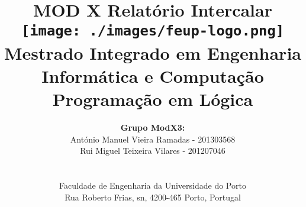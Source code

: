 \documentclass[a4paper]{article}
\begin{document}
\setlength{\textwidth}{16cm}
\setlength{\textheight}{22cm}

\title{\Huge\textbf{MOD X}\linebreak\linebreak\linebreak
\Large\textbf{Relatório Intercalar}\linebreak\linebreak
\linebreak\linebreak
\texttt{[image: ./images/feup-logo.png]}\linebreak\linebreak
\linebreak\linebreak
\Large{Mestrado Integrado em Engenharia Informática e Computação} \linebreak\linebreak
\Large{Programação em Lógica}\linebreak
}

\author{\textbf{Grupo ModX3:}\\
António Manuel Vieira Ramadas - 201303568 \\
Rui Miguel Teixeira Vilares - 201207046 \\
\linebreak\linebreak \\
 \\ Faculdade de Engenharia da Universidade do Porto \\ Rua Roberto Frias, s\/n, 4200-465 Porto, Portugal \linebreak\linebreak\linebreak
\linebreak\linebreak\vspace{1cm}}

\maketitle
\thispagestyle{empty}


\newpage
\end{document}
